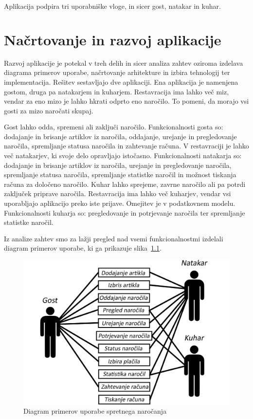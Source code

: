 \documentclass[a4paper, 12pt]{book}
\begin{document}
Aplikacija podpira tri uporabniške vloge, in sicer gost, natakar in kuhar. 

\chapter{Načrtovanje in razvoj aplikacije}

Razvoj aplikacije je potekal v treh delih in sicer analiza zahtev oziroma izdelava diagrama primerov uporabe, načrtovanje arhitekture in izbira tehnologij ter implementacija.
Rešitev sestavljajo dve aplikaciji. Ena aplikacija je namenjena gostom, druga pa natakarjem in kuharjem. Restavracija ima lahko več miz, vendar za eno mizo je lahko hkrati odprto eno naročilo. To pomeni, da morajo vsi gosti za mizo naročati skupaj. 

Gost lahko odda, spremeni ali zaključi naročilo. Funkcionalnosti gosta so: dodajanje in brisanje artiklov iz naročila, oddajanje, urejanje in pregledovanje naročila, spremljanje statusa naročila in zahtevanje računa. V restavraciji je lahko več natakarjev, ki svoje delo opravljajo istočasno. Funkcionalnosti natakarja so: dodajanje in brisanje artiklov iz naročila, urejanje in pregledovanje naročila, spremljanje statusa naročila, spremljanje statistke naročil in možnost tiskanja računa za določeno naročilo. Kuhar lahko sprejeme, zavrne naročilo ali pa potrdi zaključek priprave naročila. Restavracija ima lahko več kuharjev, vendar vsi uporabljajo aplikacijo preko iste prijave. Omejitev je v podatkovnem modelu. Funkcionalnosti kuharja so: pregledovanje in potrjevanje naročila ter spremljanje statistke naročil.

Iz analize zahtev smo za lažji pregled nad vsemi funkcionalnostmi izdelali diagram primerov uporabe, ki ga prikazuje slika~\ref{FunkVloge}.

\begin{figure}[!htb]
\begin{center}
\includegraphics[width=11.5cm]{Skica2.png}
\caption{Diagram primerov uporabe spretnega naročanja}
\label{FunkVloge}
\end{center}
\end{figure}
\end{document}
